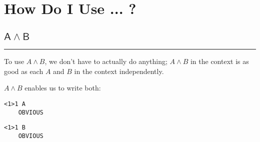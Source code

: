 \documentclass{article}
\newcommand{\code}[1]{\mathsf{#1}}
\begin{document}






\newpage
\section{How Do I Use ... ?}


\subsection{$\code{A \wedge B}$}
\hrule
\vspace{10pt}
\begin{minipage}{230pt}
To use $A \wedge B$, we don't have to actually do anything;
$A \wedge B$ in the context is as good as each $A$ and $B$ in
the context independently. \\

\vspace{5pt}

$A \wedge B$ enables us to write both:
\end{minipage}
%
\hspace{15pt} \vline \hspace{15pt}
%
\begin{minipage}{80pt}
\begin{verbatim}
<1>1 A
    OBVIOUS
\end{verbatim}
\end{minipage}
\hspace{5pt} \vline \hspace{15pt}
\begin{minipage}{80pt}
\begin{verbatim}
<1>1 B
    OBVIOUS
\end{verbatim}
\end{minipage}
\end{document}
